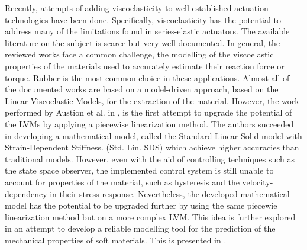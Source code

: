Recently, attempts of adding viscoelasticity to well-established actuation technologies have been done. Specifically, viscoelasticity has the potential to address many of the limitations found in series-elastic actuators. The available literature on the subject is scarce but very well documented. In general, the reviewed works face a common challenge, the modelling of the viscoelastic properties of the materials used to accurately estimate their reaction force or torque. Rubber is the most common choice in these applications. Almost all of the documented works are based on a model-driven approach, based on the Linear Viscoelastic Models, for the extraction of the material. However, the work performed by Austion et al. in \cite{austin2015control}, is the first attempt to upgrade the potential of the LVMs by applying a piecewise linearization method. The authors succeeded in developing a mathematical model, called the Standard Linear Solid model with Strain-Dependent Stiffness. (Std. Lin. SDS) which achieve higher accuracies than traditional models. However, even with the aid of controlling techniques such as the state space observer, the implemented control system is still unable to account for properties of the material, such as hysteresis and the velocity-dependency in their stress response. Nevertheless, the developed mathematical model has the potential to be upgraded further by using the same piecewie linearization method but on a more complex LVM. This idea is further explored in an attempt to develop a reliable modelling tool for the prediction of the mechanical properties of soft materials. This is presented in .


